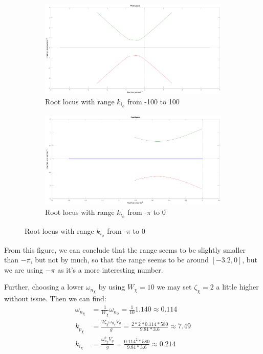 \begin{figure}[ht]
	\centering
	\begin{subfigure}[b]{0.45\textwidth}
		\includegraphics[width=\textwidth]{figures/root_locus_k_i_phi}
		\caption{Root locus with range $k_{i_\phi}$ from -100 to 100}
		\label{fig:root_locus_large_range}
	\end{subfigure}
	\begin{subfigure}[b]{0.45\textwidth}
		\includegraphics[width=\textwidth]{figures/root_locus_k_i_phi_interval_minus_pi_to_0}
		\caption{Root locus with range $k_{i_\phi}$ from -$\pi$ to 0}
		\label{fig:root_locus_proper_range}
	\end{subfigure}
\end{figure}

From this figure, we can conclude that the range seems to be slightly smaller than $-\pi$, but not by much, so that the range seems to be around $[-3.2, 0]$, but we are using $-\pi$ as it's a more interesting number. 

Further, choosing a lower $\omega_{n_\chi}$ by using $W_\chi = 10$ we may set $\zeta_\chi = 2$ a little higher without issue. Then we can find:
\begin{align*}
    \omega_{n_\chi} &= \frac{1}{W_\chi} \omega_{n_\phi} 
    = \frac{1}{10} 1.140 \approx 0.114 \\
    k_{p_\chi} &= \frac{2 \zeta_\chi \omega_{n_\chi} V_g}{g} 
    = \frac{2 * 2 * 0.114 * 580}{9.81 * 3.6} 
    \approx 7.49 \\
    k_{i_\chi} &= \frac{\omega_{n_\chi}^2 V_g}{g}
    = \frac{0.114^2 * 580}{9.81 * 3.6} 
    \approx 0.214
\end{align*}

